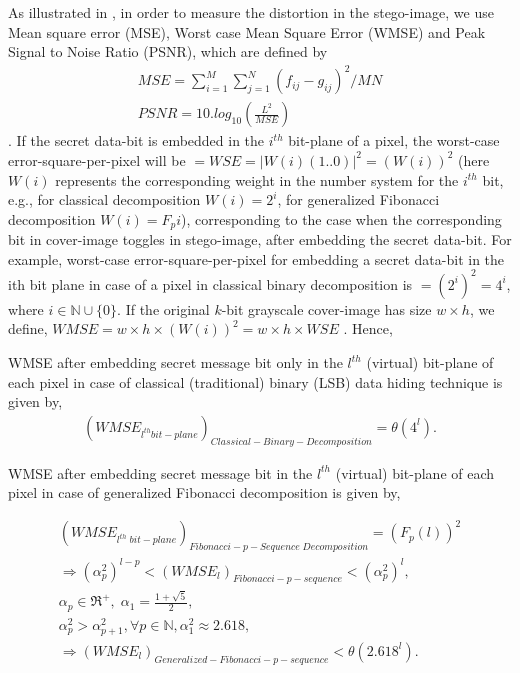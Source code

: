 \documentclass{ijcsa}
\begin{document}
As illustrated in \cite{dey08}, in order to measure the distortion in the stego-image, we use Mean square error (MSE),
Worst case Mean Square Error (WMSE) and Peak Signal to Noise Ratio (PSNR), which are defined by
\begin{eqnarray*}
MSE = \displaystyle\sum_{i=1}^{M}\sum_{j=1}^{N}(f_{ij}-g_{ij})^2/MN \\
PSNR = 10.log_{10}\left(\frac{L^2}{MSE}\right) 	
\end{eqnarray*} \cite{dey08}.
If the secret data-bit is embedded in the $i^{th}$ bit-plane of a pixel, the worst-case
error-square-per-pixel will be $= WSE = |W(i)(1..0)|^2 = (W(i))^2$ (here $W(i)$ represents the corresponding weight in the number system for the $i^{th}$ bit, e.g., for classical decomposition $W(i)=2^i$, for generalized Fibonacci decomposition $W(i)=F_p{i}$), corresponding to the case when the corresponding bit in cover-image toggles in stego-image, after embedding the secret data-bit. For example, worst-case error-square-per-pixel for embedding a secret data-bit in the ith bit plane in case of a pixel in classical
binary decomposition is $= (2^i)^2 = 4^i$, where $i \in \mathbb{N} \cup \{0\}$. If the original $k$-bit
grayscale cover-image has size $w \times h$, we define, $WMSE = w \times h \times (W(i))^2 = w \times h \times WSE$ \cite{dey08}. 
Hence,
\par WMSE after embedding secret message bit only in the $l^{th}$ (virtual) bit-plane of each pixel in case of classical 
(traditional) binary (LSB) data hiding technique is given by,
\begin{eqnarray*}
    {\left({WMSE}_{l^{th} bit-plane}\right)}_{Classical-Binary-Decomposition}=\theta(4^{l}). 
    \label{wmselsb}
\end{eqnarray*}

\par WMSE after embedding secret message bit in the $l^{th}$ (virtual) bit-plane of each pixel in case of 
generalized Fibonacci decomposition is given by,

 \begin{eqnarray*}
 {\left({WMSE}_{l^{th}\;bit-plane}\right)}_{Fibonacci-p-Sequence\;Decomposition}
 =\left(F_p(l)\right)^{2} \\
 \Rightarrow \left(\alpha_{p}^{2}\right)^{l-p} < {\left({WMSE}_{l}\right)}_{Fibonacci-p-sequence} 
 <\left(\alpha_{p}^{2}\right)^{l}, \\
 \alpha_{p}\in\Re^{+},\;\alpha_{1}=\frac{1+\sqrt{5}}{2},\\
 \alpha_{p}^{2}>\alpha_{p+1}^{2},\forall{p}\in \mathbb{N}, \alpha_{1}^{2} \approx 2.618, \\
 \Rightarrow {\left({WMSE}_{l}\right)}_{Generalized-Fibonacci-p-sequence}  < \theta \left({2.618}^l \right).
 \end{eqnarray*}
\end{document}
